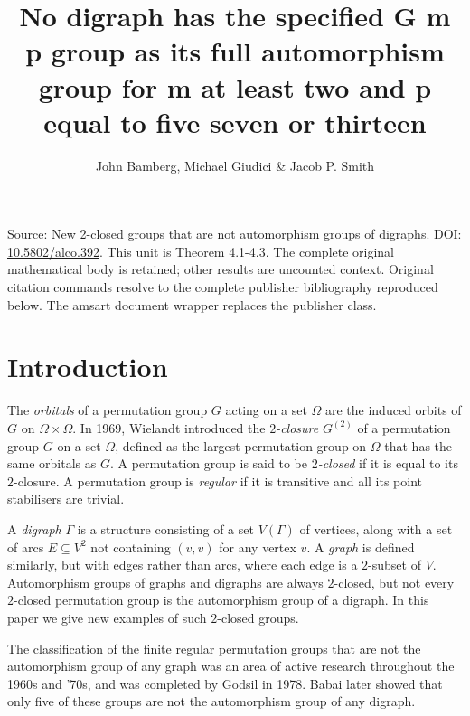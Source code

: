\documentclass[10pt]{amsart}
\title[Human proof corpus 1008]{No digraph has the specified G m p group as its full automorphism group for m at least two and p equal to five seven or thirteen}
\author{John Bamberg, Michael Giudici \& Jacob P. Smith}
\theoremstyle{definition}
\theoremstyle{plain}
\theoremstyle{plain}
\theoremstyle{plain}
\theoremstyle{plain}
\begin{document}
\maketitle
\noindent Source: New 2-closed groups that are not automorphism groups of digraphs. DOI: \href{https://doi.org/10.5802/alco.392}{10.5802/alco.392}. This unit is Theorem 4.1-4.3. The complete original mathematical body is retained; other results are uncounted context. Original citation commands resolve to the complete publisher bibliography reproduced below. The amsart document wrapper replaces the publisher class.


\section{Introduction}

The \emph{orbitals} of a permutation group $G$ acting on a set $\Omega$ are the induced orbits of $G$ on $\Omega \times \Omega$. In 1969, Wielandt \cite{ref:wielandt-invarient} introduced the \emph{$2$-closure} $G^{\left(2 \right)}$ of a permutation group $G$ on a set $\Omega$, defined as the largest permutation group on $\Omega$ that has the same orbitals as $G$. A permutation group is said to be \emph{$2$-closed} if it is equal to its $2$-closure. A permutation group is \emph{regular} if it is transitive and all its point stabilisers are trivial.

A \emph{digraph} $\Gamma$ is a structure consisting of a set $V{\left(\Gamma \right)}$ of vertices, along with a set of arcs $E \subseteq V^2$ not containing $\left(v, v \right)$ for any vertex $v$. A \emph{graph} is defined similarly, but with edges rather than arcs, where each edge is a $2$-subset of $V$. Automorphism groups of graphs and digraphs are always $2$-closed, but not every $2$-closed permutation group is the automorphism group of a digraph. In this paper we give new examples of such $2$-closed groups.

The classification of the finite regular permutation groups that are not the automorphism group of any graph was an area of active research throughout the 1960s and '70s, and was completed by Godsil \cite{ref:godsil-nonsolvable} in 1978. Babai \cite{ref:babai-drr} later showed that only five of these groups are not the automorphism group of any digraph.
\end{document}
